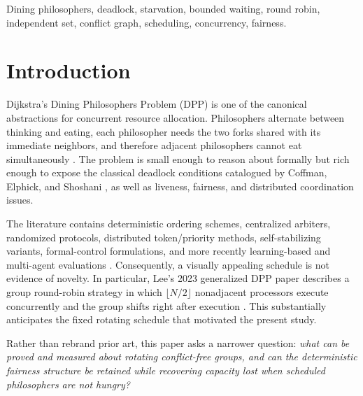 \documentclass[10pt,journal]{IEEEtran}
\begin{document}
\begin{IEEEkeywords}
Dining philosophers, deadlock, starvation, bounded waiting, round robin, independent set, conflict graph, scheduling, concurrency, fairness.
\end{IEEEkeywords}

\section{Introduction}
Dijkstra's Dining Philosophers Problem (DPP) is one of the canonical abstractions for concurrent resource allocation. Philosophers alternate between thinking and eating, each philosopher needs the two forks shared with its immediate neighbors, and therefore adjacent philosophers cannot eat simultaneously \cite{dijkstra1971}. The problem is small enough to reason about formally but rich enough to expose the classical deadlock conditions catalogued by Coffman, Elphick, and Shoshani \cite{coffman1971}, as well as liveness, fairness, and distributed coordination issues.

The literature contains deterministic ordering schemes, centralized arbiters, randomized protocols, distributed token/priority methods, self-stabilizing variants, formal-control formulations, and more recently learning-based and multi-agent evaluations \cite{hoare1978,lehmann1981,chandy1984,rana1986,adamek2017,choppella2020,ozkurt2026,hasan2026}. Consequently, a visually appealing schedule is not evidence of novelty. In particular, Lee's 2023 generalized DPP paper describes a group round-robin strategy in which $\lfloor N/2\rfloor$ nonadjacent processors execute concurrently and the group shifts right after execution \cite{lee2023}. This substantially anticipates the fixed rotating schedule that motivated the present study.

Rather than rebrand prior art, this paper asks a narrower question: \emph{what can be proved and measured about rotating conflict-free groups, and can the deterministic fairness structure be retained while recovering capacity lost when scheduled philosophers are not hungry?}
\end{document}
